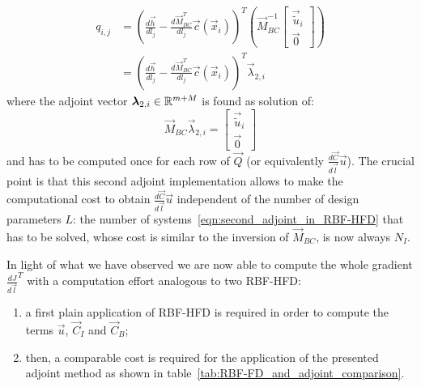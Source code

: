 \begin{equation}
	\begin{aligned}
		q_{i,j} & =
		\left( \frac{d \vec{h}}{d l_j} - \frac{d \vec{M}_{BC}^T}{d l_j} \vec{c}(\vec{x}_i) \right)^T
		\left(
		\vec{M}_{BC}^{-1}
		\begin{bmatrix}
			\vec{\tilde{u}}_i  \\
			\vec{0}
		\end{bmatrix}
		\right)  \\
		& =
		\left( \frac{d \vec{h}}{d l_j} - \frac{d \vec{M}_{BC}^T}{d l_j} \vec{c}(\vec{x}_i) \right)^T
		\vec{\lambda}_{2,i}
	\end{aligned}
\end{equation}
where the adjoint vector $\boldsymbol{\lambda}_{2,i} \in \mathbb{R}^{m+M}$ is found as solution of:
\begin{equation}
	\label{eqn:second_adjoint_in_RBF-HFD}
	\vec{M}_{BC} \vec{\lambda}_{2,i} =
	\begin{bmatrix}
		\vec{\tilde{u}}_i  \\
		\vec{0}
	\end{bmatrix}
\end{equation}
and has to be computed once for each row of $\vec{Q}$ (or equivalently $\frac{d\vec{C}}{d\vec{l}} \vec{u}$). The crucial point is that this second adjoint implementation allows to make the computational cost to obtain $\frac{d\vec{C}}{d\vec{l}} \vec{u}$ independent of the number of design parameters $L$: the number of systems~\eqref{eqn:second_adjoint_in_RBF-HFD} that has to be solved, whose cost is similar to the inversion of $\vec{M}_{BC}$, is now always $N_I$.

\smallskip
In light of what we have observed we are now able to compute the whole gradient $\frac{dJ}{d\vec{l}}^T$ with a computation effort analogous to two RBF-HFD:
\begin{enumerate}
	\item a first plain application of RBF-HFD is required in order to compute the terms $\vec{u}$, $\vec{C}_I$ and $\vec{C}_B$;
	\item then, a comparable cost is required for the application of the presented adjoint method as shown in table~\ref{tab:RBF-FD_and_adjoint_comparison}.
\end{enumerate}

